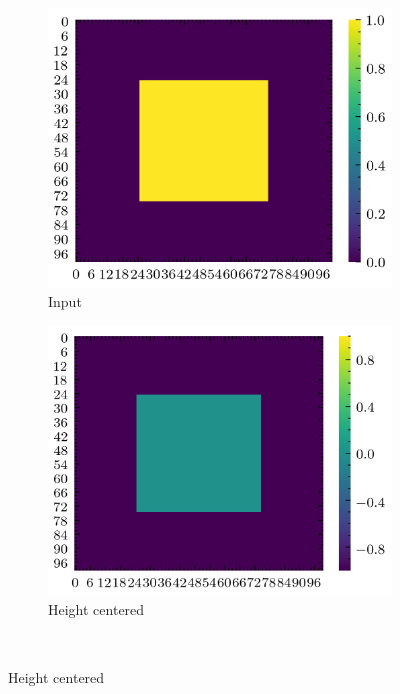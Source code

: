 \documentclass[../document.tex]{subfiles}
\begin{document}
\begin{figure}[H]
    \centering
    \begin{subfigure}[b]{0.32\textwidth}
        \includegraphics[width=\textwidth]{../img/data-aug/2d/square-middle.png}
        \caption{Input}
    \end{subfigure}
    \begin{subfigure}[b]{0.32\textwidth}
        \includegraphics[width=\textwidth]{../img/data-aug/2d/square-middle-center.png}
        \caption{Height centered}
    \end{subfigure}  
    \\

\end{figure}
\end{document}
